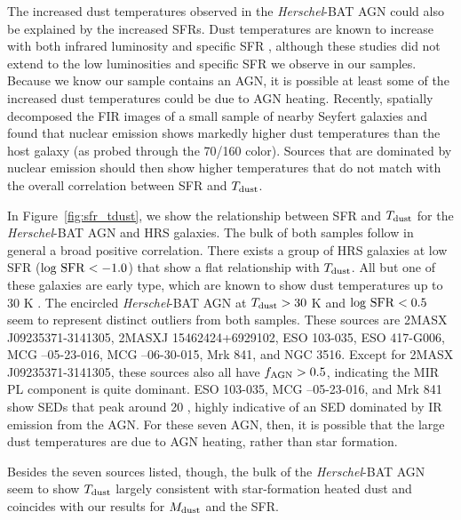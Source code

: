 \documentclass[fleqn, usenatbib]{mnras}
\newcommand{\herschel}{\emph{Herschel}}
\newcommand{\mdust}{$M_{\rm dust}$}
\newcommand{\tdust}{$T_{\rm dust}$}
\begin{document}
The increased dust temperatures observed in the \herschel-BAT AGN could also be explained by the increased SFRs. Dust temperatures are known to increase with both infrared luminosity and specific SFR \citep[e.g][]{Chapman:2003jk, Symeonidis:2013fe, Cortese:2014qq, Magnelli:2014sf}, although these studies did not extend to the low luminosities and specific SFR we observe in our samples. Because we know our sample contains an AGN, it is possible at least some of the increased dust temperatures could be due to AGN heating. Recently, \citet{Garcio-Gonzalez:2016bk} spatially decomposed the FIR images of a small sample of nearby Seyfert galaxies and found that nuclear emission shows markedly higher dust temperatures than the host galaxy (as probed through the 70/160 \micron{} color). Sources that are dominated by nuclear emission should then show higher temperatures that do not match with the overall correlation between SFR and $T_{\rm dust}$. 

In Figure~\ref{fig:sfr_tdust}, we show the relationship between SFR and $T_{\rm dust}$ for the \herschel-BAT AGN and HRS galaxies. The bulk of both samples follow in general a broad positive correlation. There exists a group of HRS galaxies at low SFR ($\log\,\rm{SFR} < -1.0$) that show a flat relationship with $T_{\rm dust}$. All but one of these galaxies are early type, which are known to show dust temperatures up to 30 K \citep{Temi:2007ty}. The encircled \herschel-BAT AGN at $T_{\rm dust} > 30$ K and $\log\,\rm{SFR} < 0.5$ seem to represent distinct outliers from both samples. These sources are 2MASX J09235371-3141305, 2MASXJ 15462424+6929102, ESO 103-035, ESO 417-G006, MCG --05-23-016, MCG --06-30-015, Mrk 841, and NGC 3516. Except for  2MASX J09235371-3141305, these sources also all have $f_{\rm AGN} > 0.5$, indicating the MIR PL component is quite dominant. ESO 103-035, MCG --05-23-016, and Mrk 841 show SEDs that peak around 20 \micron, highly indicative of an SED dominated by IR emission from the AGN. For these seven AGN, then, it is possible that the large dust temperatures are due to AGN heating, rather than star formation. 

Besides the seven sources listed, though, the bulk of the \herschel-BAT AGN seem to show \tdust{} largely consistent with star-formation heated dust and coincides with our results for \mdust{} and the SFR. 
\end{document}
